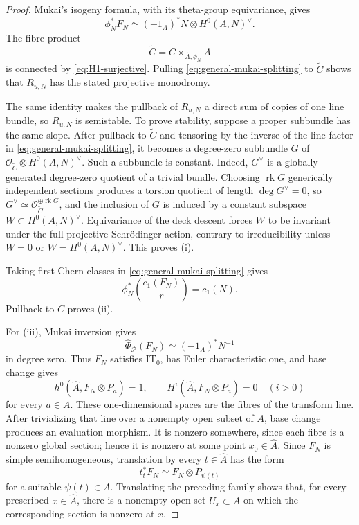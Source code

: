 \documentclass[11pt,reqno]{amsart}
\numberwithin{equation}{section}
\theoremstyle{remark}
\DeclareMathOperator{\rk}{rk}
\newcommand{\cO}{\mathcal O}
\begin{document}
\begin{proof}
Mukai's isogeny formula, with its theta-group equivariance, gives
\[
 \phi_N^*F_N\simeq
 (-1_A)^*N\otimes H^0(A,N)^\vee.
\tag{8.10}\label{eq:general-mukai-splitting}
\]
The fibre product
\[
 \widetilde C=C\times_{\widehat A,\phi_N}A
\]
is connected by \eqref{eq:H1-surjective}.  Pulling
\eqref{eq:general-mukai-splitting} to \(\widetilde C\) shows that
\(R_{u,N}\) has the stated projective monodromy.

The same identity makes the pullback of \(R_{u,N}\) a direct sum of
copies of one line bundle, so \(R_{u,N}\) is semistable.  To prove
stability, suppose a proper subbundle has the same slope.
After pullback to \(\widetilde C\) and tensoring by the inverse of the
line factor in \eqref{eq:general-mukai-splitting}, it becomes a
degree-zero subbundle \(G\) of
\(\cO_{\widetilde C}\otimes H^0(A,N)^\vee\).  Such a subbundle is
constant.  Indeed, \(G^\vee\) is a globally generated degree-zero
quotient of a trivial bundle.  Choosing \(\rk G\) generically independent
sections produces a torsion quotient of length \(\deg G^\vee=0\), so
\(G^\vee\simeq\cO_{\widetilde C}^{\oplus\rk G}\), and the inclusion of
\(G\) is induced by a constant subspace
\(W\subset H^0(A,N)^\vee\).  Equivariance of the deck descent forces
\(W\) to be
invariant under the full projective Schr\"odinger action, contrary to
irreducibility unless \(W=0\) or \(W=H^0(A,N)^\vee\).  This proves (i).

Taking first Chern classes in
\eqref{eq:general-mukai-splitting} gives
\[
 \phi_N^*\!\left(\frac{c_1(F_N)}r\right)=c_1(N).
\]
Pullback to \(C\) proves (ii).

For (iii), Mukai inversion \cite{Mukai} gives
\[
 \widehat\Phi_{\mathcal P}(F_N)\simeq(-1_A)^*N^{-1}
\]
in degree zero.  Thus \(F_N\) satisfies \(\mathrm{IT}_0\), has Euler
characteristic one, and base change gives
\[
 h^0(\widehat A,F_N\otimes P_a)=1,\qquad
 H^i(\widehat A,F_N\otimes P_a)=0\quad(i>0)
\]
for every \(a\in A\).  These one-dimensional spaces are the fibres of
the transform line.  After trivializing that line over a nonempty open
subset of \(A\), base change produces an evaluation morphism.  It is
nonzero somewhere, since each fibre is a nonzero global section; hence it
is nonzero at some point \(x_0\in\widehat A\).  Since \(F_N\) is simple
semihomogeneous, translation by every
\(t\in\widehat A\) has the form
\[
 t_t^*F_N\simeq F_N\otimes P_{\psi(t)}
\tag{8.11}\label{eq:semihomogeneous-translation}
\]
for a suitable \(\psi(t)\in A\).  Translating the preceding family shows
that, for every prescribed \(x\in\widehat A\), there is a nonempty open
set \(U_x\subset A\) on which the corresponding section is nonzero at
\(x\).


\end{proof}
\end{document}
